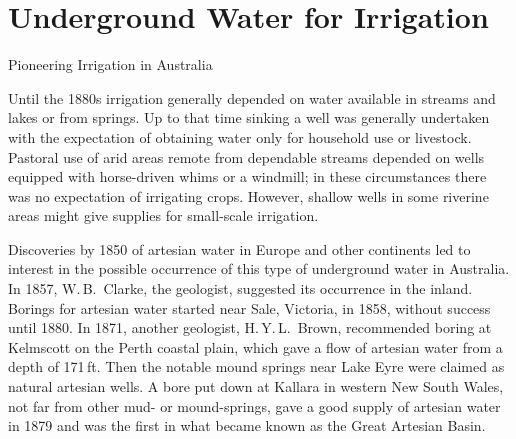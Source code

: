 
\setcounter{endnote}{0}

\chapter{Underground Water for Irrigation}
\label{ch:underground}
%
{Pioneering Irrigation in Australia}

Until the 1880s irrigation generally depended on water available in
streams and lakes or from springs.  Up to that time sinking a well was
generally undertaken with the expectation of obtaining water only for
household use or livestock.  Pastoral use of arid areas remote from
dependable streams depended on wells equipped with horse-driven whims
or a windmill; in these circumstances there was no expectation of
irrigating crops.  However, shallow wells in some riverine areas might
give supplies for small-scale irrigation.

Discoveries by 1850 of artesian water in Europe and other continents
led to interest in the possible occurrence of this type of underground
water in Australia.  In 1857, W.\,B.~Clarke, 
the geologist, suggested its occurrence in the inland. Borings for
artesian water started near Sale,  Victoria, in 1858,
without success until 1880.  In 1871, another geologist,
H.\,Y.\,L.~Brown,  recommended boring at
Kelmscott  on the Perth coastal plain, which gave
a flow of artesian water from a depth of 171\,ft.  Then the notable
mound springs  near Lake Eyre 
were claimed as natural artesian wells. A bore put down at Kallara
 in western New South Wales, not far from other
mud- or mound-springs, gave a good supply of artesian water in 1879
and was the first in what became known as the Great Artesian
 Basin.

